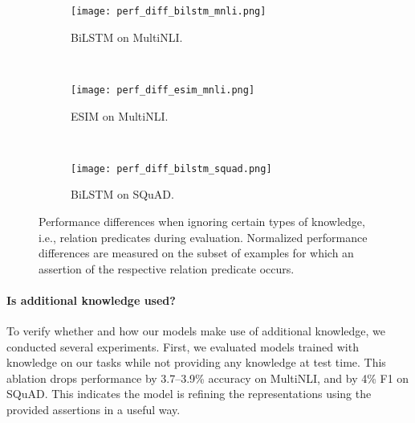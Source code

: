 \documentclass[11pt,a4paper]{article}
\begin{document}
\begin{figure*}[ht!]
\begin{subfigure}{0.32\textwidth}
\texttt{[image: perf\_diff\_bilstm\_mnli.png]}
\caption{BiLSTM on MultiNLI.}
\end{subfigure}~
\begin{subfigure}{0.3\textwidth}
\texttt{[image: perf\_diff\_esim\_mnli.png]}
\caption{ESIM on MultiNLI.}
\end{subfigure}~
\begin{subfigure}{0.3\textwidth}
\texttt{[image: perf\_diff\_bilstm\_squad.png]}
\caption{BiLSTM on SQuAD.}
\end{subfigure}
\caption{Performance differences when ignoring certain types of knowledge, i.e., relation predicates during evaluation. Normalized performance differences are measured on the subset of examples for which an assertion of the respective relation predicate occurs.}\label{fig:ignore_relation}
\end{figure*}


\paragraph{Is additional knowledge used?} To verify whether and how our models make use of additional knowledge, we conducted several experiments. First, we evaluated models trained with knowledge on our tasks while not providing any knowledge at test time. This ablation drops performance by 3.7--3.9\% accuracy on MultiNLI, and by 4\% F1 on SQuAD. This indicates the model is refining the representations using the provided assertions in a useful way.
\end{document}
